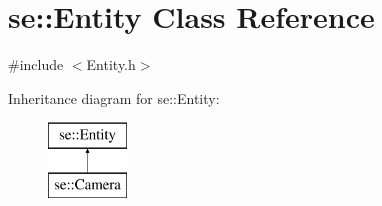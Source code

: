\hypertarget{classse_1_1_entity}{}\section{se\+:\+:Entity Class Reference}
\label{classse_1_1_entity}


{\ttfamily \#include $<$Entity.\+h$>$}

Inheritance diagram for se\+:\+:Entity\+:\begin{figure}[H]
\begin{center}
\leavevmode
\includegraphics[height=2.000000cm]{classse_1_1_entity}
\end{center}
\end{figure}

